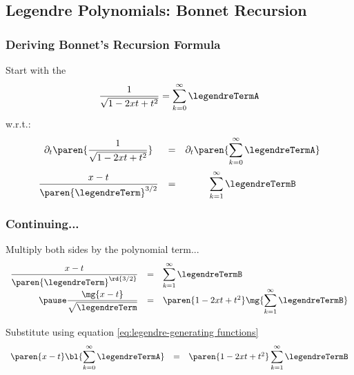 \subsection{Legendre Polynomials: Bonnet Recursion}
\begin{frame}\frametitle{Deriving Bonnet's Recursion Formula}
Start with the \href{https://en.wikipedia.org/wiki/Legendre\_polynomials\#Definition\_via\_generating\_function}{}
\begin{equation}
	\frac{1}{\sqrt{1 - 2xt + t^{2}}} = \displaystyle\sum_{k=0}^{\infty}{\legendreTermA}
\label{eq:legendre-generating functions}
\end{equation}
  w.r.t.:
\begin{equation}
	\begin{array}{ccc}
		\partial_{t} \displaystyle\paren{\frac{1}{\sqrt{1 - 2xt + t^{2}}}} &=& \partial_{t} \paren{ \displaystyle\sum_{k=0}^{\infty}{\legendreTermA} } \\[15pt]
		\displaystyle\frac{x-t}{\paren{\legendreTerm}^{3/2}}  &=& \displaystyle\sum_{k=1}^{\infty}{\legendreTermB} \\
	\end{array}
\end{equation}
\end{frame}

\begin{frame}\frametitle{Continuing...}
Multiply both sides by the polynomial term...
\begin{equation}
	\begin{array}{rcl}
		\displaystyle\frac{x-t}{\paren{\legendreTerm}^{\rd{3/2}}}  &=& \displaystyle\sum_{k=1}^{\infty}{\legendreTermB} \\
		\pause
		\displaystyle\frac{\mg{x-t}}{\sqrt{\legendreTerm}} &=& \paren{1 - 2xt + t^{2}}\mg{\displaystyle\sum_{k=1}^{\infty}{\legendreTermB}} \\[15pt]
	\end{array}
\end{equation}
%
\pause
Substitute using equation \eqref{eq:legendre-generating functions}
\begin{equation}
	\begin{array}{rcl}
		\displaystyle\paren{x-t}\bl{\sum_{k=0}^{\infty}\legendreTermA} &=& \paren{1 - 2xt + t^{2}}\displaystyle\sum_{k=1}^{\infty}{\legendreTermB}
	\end{array}
\label{eq:form-a}
\end{equation}
\end{frame}

